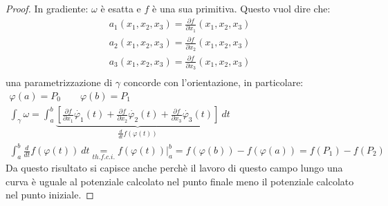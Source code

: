 \documentclass[a4paper, oneside]{article}
\begin{document}
    \begin{proof}
        In gradiente: $\omega$ è esatta e $f$ è una sua primitiva. Questo vuol dire che:
        \begin{gather*}
            a_1(x_1,x_2,x_3) = \frac{\partial f}{\partial x_1}(x_1,x_2,x_3)\\
            a_2(x_1,x_2,x_3) = \frac{\partial f}{\partial x_2}(x_1,x_2,x_3)\\
            a_3(x_1,x_2,x_3) = \frac{\partial f}{\partial x_3}(x_1,x_2,x_3)\\
        \end{gather*}
         una parametrizzazione di $\gamma$ concorde con l'orientazione, in particolare:
        \begin{gather*}
            \varphi(a) = P_0 \qquad \varphi(b) = P_1\\
            \int_{\gamma} \omega = \int_{a}^{b} \underbrace{\left[ \frac{\partial f}{\partial x_1}\dot{\varphi_1}(t) + \frac{\partial f}{\partial x_2}\dot{\varphi_2}(t) + \frac{\partial f}{\partial x_3}\dot{\varphi_3}(t)\right]}_{\frac{d}{dt} f(\varphi(t))}  \ dt\\
            \int_{a}^{b} \frac{d}{dt} f(\varphi(t)) \ dt \underset{th.f.c.i.}{=} f(\varphi(t)) |_a^b = f(\varphi(b)) - f(\varphi(a)) = f(P_1) - f(P_2)
        \end{gather*}
    Da questo risultato si capisce anche perchè il lavoro di questo campo lungo una curva è uguale al potenziale calcolato nel punto finale meno il potenziale calcolato nel punto iniziale.
    \end{proof}
\end{document}

